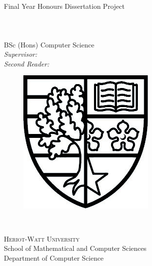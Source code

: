 \begin{titlepage}

\begin{center}
	~\\[1cm]
	{\huge \docTitle}\\

	{\Large Final Year Honours Dissertation Project}\\
	~\\[1cm]
	
	{\Large \docAuthor}\\[0.3cm]
	{\Large \docAuthorNumber}\\[0.3cm]
	{\large BSc (Hons) Computer Science}\\[0.5cm]
	{\large \emph{Supervisor:} {\Large \docSupervisor}}\\[0.5cm]
    {\large \emph{Second Reader:} {\Large \docSecondReader}}
	~\\[1cm]
	
	\begin{figure}[h]
		\begin{center}
		\includegraphics[]{images/hwcoa_bw.jpg}
		\end{center}
	\end{figure}	
	~\\[0cm]
	\begin{large}
		\textsc{Heriot-Watt University}\\
		School of Mathematical and Computer Sciences\\
		Department of Computer Science
	\end{large}
	~\\[1cm]
	
	~\\[2cm]
	{\Large \docDate}\\
	
	
\end{center}



\end{titlepage}